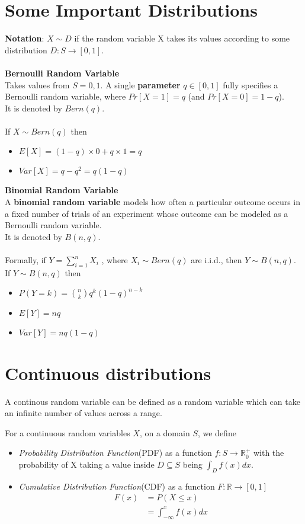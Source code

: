 \documentclass[12pt]{article}
\begin{document}
\section{Some Important Distributions}



    
\textbf{Notation}: $X ∼ D$ if the random variable X takes its values according to
some distribution $D : S → [0, 1]$.
\\ \\
\textbf{Bernoulli Random Variable}\\ Takes values from $S = {0, 1}$.
A single \textbf{parameter} $q \in [0, 1]$ fully 
specifies a Bernoulli random variable, where
$Pr[X = 1] = q$ (and $Pr [X = 0] = 1 − q$). \\
It is denoted by $Bern(q)$.\\ \\
If $X ∼ Bern(q)$ then
\begin{itemize}
 \item$E [X ] = (1 − q) × 0 + q × 1 = q$
 \item$Var [X ] = q − q^2 = q(1 − q)$
\end{itemize}
\textbf{Binomial Random Variable}\\
A \textbf{binomial random variable} models how often a particular outcome occurs in a fixed number of trials of an experiment whose outcome can be modeled as a Bernoulli random variable.\\
It is denoted by $B(n, q)$. \\ \\
Formally, if $Y = \sum_{i=1}^n{X_i}$ , where $X_i ∼ Bern(q)$ are i.i.d., then $Y ∼ B(n, q)$.
If $Y ∼ B(n, q)$ then
\begin{itemize}
\item $P(Y=k)=\binom{n}{k}q^k(1-q)^{n-k}$
    \item $E [Y ] = nq $
    \item $Var [Y ] = nq(1 − q)$
\end{itemize}
\section{Continuous distributions}
A continous random variable can be defined as a random variable which can take an infinite number of values across a range.

For a continuous random variables $X$, on a domain $S$, we define \begin{itemize}
    \item \emph{Probability Distribution Function}(PDF) as a function $f:S \to \mathbb{R}_0^+$ with the probability of X taking a value inside $D \subseteq S$ being $\int_D f(x)dx$.
    \item  \emph{Cumulative Distribution Function}(CDF) as a function $F : \mathbb{R} \to [0,1]$
\begin{align*}
    F(x) &= P(X \le x)\\
        &= \int_{-\infty}^{x} f(x)dx
\end{align*}
\end{itemize}
\end{document}
